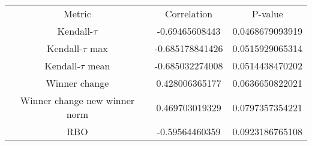\begin{tabular}{c|c|c}
Metric & Correlation & P-value \\ 
Kendall-$\tau$ & -0.69465608443 & 0.0468679093919 \\ 
Kendall-$\tau$ max & -0.685178841426 & 0.0515929065314 \\ 
Kendall-$\tau$ mean & -0.685032274008 & 0.0514438470202 \\ 
Winner change & 0.428006365177 & 0.0636650822021 \\ 
Winner change new winner norm & 0.469703019329 & 0.0797357354221 \\ 
RBO & -0.59564460359 & 0.0923186765108 \\ 
\end{tabular}